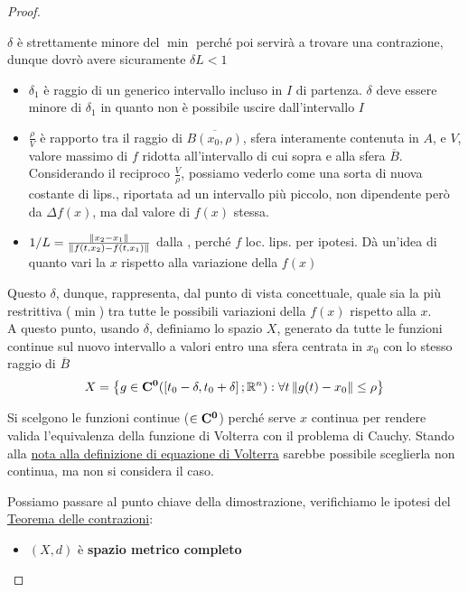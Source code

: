 \begin{proof}
\begin{equation}
	\end{equation}
	\begin{note}
		$\delta$ è strettamente minore del $\min$ perché poi servirà a trovare una contrazione, dunque dovrò avere sicuramente $\delta L < 1$
	\end{note}
	\begin{itemize}
		\item $\delta_1$ è raggio di un generico intervallo incluso in $I$ di partenza. $\delta$ deve essere minore di $\delta_1$ in quanto non è possibile uscire dall'intervallo $I$
		\item $\frac{\rho}{V}$ è rapporto tra il raggio di $\overline{B(x_0,\rho)}$, sfera interamente contenuta in $A$, e $V$, valore massimo di $f$ ridotta all'intervallo di cui sopra e alla sfera $\overline{B}$.\\
		Considerando il reciproco $\frac{V}{\rho}$, possiamo vederlo come una sorta di nuova costante di lips., riportata ad un intervallo più piccolo, non dipendente però da $\Delta f(x)$, ma dal valore di $f(x)$ stessa.
		\item $1/L = \frac{\left\|x_2-x_1\right\|}{\left\|f(t,x_2)-f(t,x_1)\right\|}$ dalla , perché $f$ loc. lips. per ipotesi. Dà un'idea di quanto vari la $x$ rispetto alla variazione della $f(x)$
	\end{itemize}
	Questo $\delta$, dunque, rappresenta, dal punto di vista concettuale, quale sia la più restrittiva ($\min$) tra tutte le possibili variazioni della $f(x)$ rispetto alla $x$.\\
	A questo punto, usando $\delta$, definiamo lo spazio $X$, generato da tutte le funzioni continue sul nuovo intervallo a valori entro una sfera centrata in $x_0$ con lo stesso raggio di $\overline{B}$
	$$X = \left\{g\in \mathbf{C^{0}}(\left[t_0-\delta,t_0+\delta\right];\mathbb{R}^n):\forall t\left\|g(t)-x_0\right\|\leq \rho\right\}$$
	\begin{note}
		Si scelgono le funzioni continue ($\in \mathbf{C^{0}}$) perché serve $x$ continua per rendere valida l'equivalenza della funzione di Volterra con il problema di Cauchy. Stando alla \hyperlink{note:volterra_non_cont}{nota alla definizione di equazione di Volterra} sarebbe possibile sceglierla non continua, ma non si considera il caso.
	\end{note}
	Possiamo passare al punto chiave della dimostrazione, verifichiamo le ipotesi del \hyperref[teo:contrazioni]{Teorema delle contrazioni}:
	\begin{itemize}
		\item $(X,d)$ è \textbf{spazio metrico completo}\\

\end{itemize}
\end{proof}
